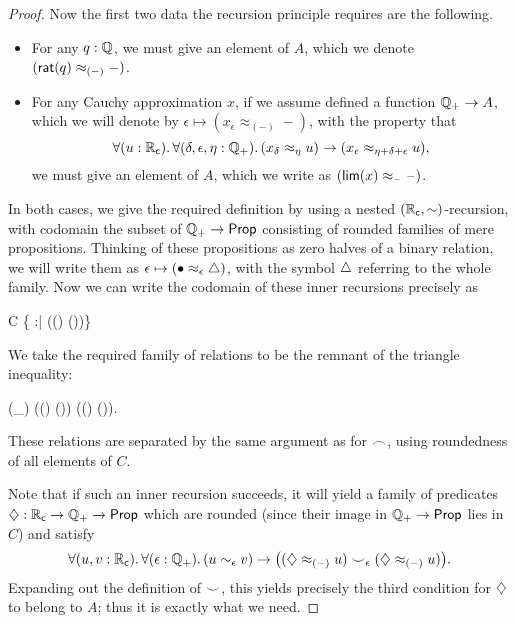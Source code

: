 \begin{proof}
  Now the first two data the recursion principle requires are the following.
  \begin{itemize}
  \item For any $q:\mathbb{Q}$, we must give an element of $A$, which we denote $(\mathsf{rat}(q)\approx_{(-)} -)$.
  \item For any Cauchy approximation $x$, if we assume defined a function $\mathbb{Q}_{+} \to A$, which we will denote by $\epsilon \mapsto (x_\epsilon \approx_{(-)} -)$, with the property that 
    \begin{equation}
      \fall{u:\RC}{\delta,\epsilon,\eta:\Qp} (x_\delta \approx_\eta u) \to (x_\epsilon \approx_{\eta+\delta+\epsilon} u),\label{eq:appxrec2}
    \end{equation}
    we must give an element of $A$, which we write as $(\mathsf{lim}(x)\approx_{\mathord{\hspace{1pt}\text{--}\hspace{1pt}}} \mathord{\hspace{1pt}\text{--}\hspace{1pt}})$.
  \end{itemize}
  In both cases, we give the required definition by using a nested $(\mathbb{R}_\mathsf{c},\mathord\sim)$-recursion, with codomain the subset of $\mathbb{Q}_{+}\to\mathsf{Prop}$ consisting of rounded families of mere propositions.
  Thinking of these propositions as zero halves of a binary relation, we will write them as $\epsilon \mapsto (\bullet\approx_{\epsilon}\triangle)$, with the symbol $\triangle$ referring to the whole family.
  Now we can write the codomain of these inner recursions precisely as
  \begin{narrowmultline*}
    C 
    \bigg\{ \tapname :\Qp\to\prop \;\;\Big|\;\; \narrowbreak
    \fall{\epsilon:\Qp} \Big((\tap\epsilon) \Leftrightarrow \exis{\theta:\Qp} (\tap{\epsilon-\theta})\Big)\bigg\}
  \end{narrowmultline*}
  We take the required family of relations to be the remnant of the triangle inequality:
  \begin{narrowmultline*}
    (\tapname \bbsim_\epsilon \tapbname) 
    \fall{\eta:\Qp} ((\tap\eta) \to (\tapb{\epsilon+\eta})) \land
    \narrowbreak
    ((\tapb\eta) \to (\tap{\epsilon+\eta})).
  \end{narrowmultline*}
  These relations are separated by the same argument as for $\frown$, using roundedness of all elements of $C$.

  Note that if such an inner recursion succeeds, it will yield a family of predicates $\diamondsuit : \mathbb{R}_\mathsf{c}\to\mathbb{Q}_{+}\to \mathsf{Prop}$ which are rounded
(since their image in $\mathbb{Q}_{+}\to\mathsf{Prop}$ lies in $C$) and satisfy
  \[ \fall{u,v:\RC}{\epsilon:\Qp} (u\close\epsilon v) \to \big((\hapx_{(-)} u) \bbsim_\epsilon (\hapx_{(-)} u)\big). \]
  Expanding out the definition of $\smile$, this yields precisely the third condition for $\diamondsuit$ to belong to $A$; thus it is exactly what we need.


\end{proof}

